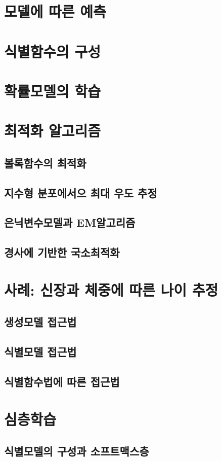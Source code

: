 \documentclass[../main.tex]{subfiles}
\begin{document}
\section{모델에 따른 예측}
\section{식별함수의 구성}
\section{확률모델의 학습}
\section{최적화 알고리즘}
\subsection{볼록함수의 최적화}
\subsection{지수형 분포에서으 최대 우도 추정}
\subsection{은닉변수모델과 EM알고리즘}
\subsection{경사에 기반한 국소최적화}
\section{사례: 신장과 체중에 따른 나이 추정}
\subsection{생성모델 접근법}
\subsection{식별모델 접근법}
\subsection{식별함수법에 따른 접근법}

\section{심층학습}
\subsection{식별모델의 구성과 소프트맥스층}
\end{document}
